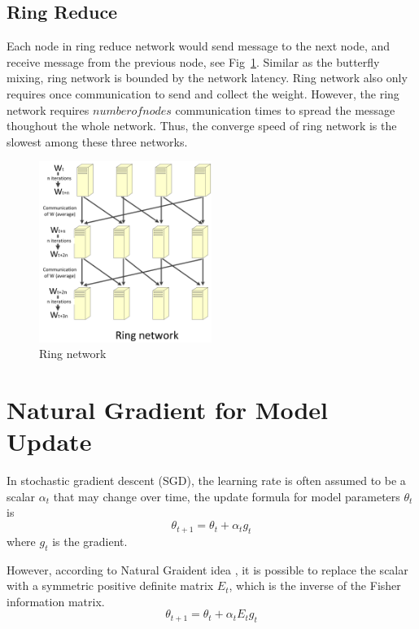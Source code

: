 \documentclass{article}
\begin{document}
\subsection{Ring Reduce}
Each node in ring reduce network would send message to the next node, and receive message from the previous node, 
see Fig~\ref{fig:ring}. Similar as the butterfly mixing, ring network is bounded by the network latency. Ring network also 
only requires once communication to send and collect the weight. However, the ring network requires $number of nodes$ 
communication times to spread the message thoughout the whole network. Thus, the converge speed of 
ring network is the slowest among these three networks. 
\begin{figure}[htb]
  \centering
  \includegraphics[width=0.5\textwidth]{ring.jpg}
  \caption{Ring network}
  \label{fig:ring}
\end{figure}

\section{Natural Gradient for Model Update}
In stochastic gradient descent (SGD), the learning rate is often assumed to be a scalar $\alpha_t$ that may change over time,
the update formula for model parameters $\theta_{t}$ is
\begin{equation}
\theta_{t+1} = \theta_{t} + \alpha_t g_t
\end{equation}
where $g_t$ is the gradient.

However, according to Natural Graident idea \cite{murata1999statistical,roux2008topmoumoute}, it is possible to replace the scalar with a 
symmetric positive definite matrix $E_t$, which is the inverse of the Fisher information matrix.
\begin{equation}
\theta_{t+1} = \theta_{t} + \alpha_t E_t g_t
\end{equation}
\end{document}

